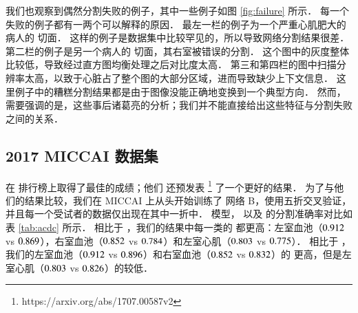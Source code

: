 

我们也观察到偶然分割失败的例子，其中一些例子如图 \ref{fig:failure} 所示．
每一个失败的例子都有一两个可以解释的原因．
最左一栏的例子为一个严重心肌肥大的病人的 \SA{} 切面．
这样的例子是数据集中比较罕见的，所以导致网络分割结果很差．
第二栏的例子是另一个病人的 \SA{} 切面，其右室被错误的分割．
这个图中的灰度整体比较低，导致经过直方图均衡处理之后对比度太高．
第三和第四栏的图中扫描分辨率太高，以致于心脏占了整个图的大部分区域，进而导致缺少上下文信息．
这里例子中的糟糕分割结果都是由于图像没能正确地变换到一个典型方向．
然而，需要强调的是，这些事后诸葛亮的分析；我们并不能直接给出这些特征与分割失败之间的关系．

\subsection{2017 MICCAI \miccaidata{} 数据集}

\citet{Isensee2017} 在 \miccaidata{} 排行榜上取得了最佳的成绩；他们 \citep{Isensee2018} 还预发表 \footnote{https://arxiv.org/abs/1707.00587v2} 了一个更好的结果．
为了与他们的结果比较，我们在 MICCAI \miccaidata{} 上从头开始训练了 \omeganet{} 网络 B，使用五折交叉验证，并且每一个受试者的数据仅出现在其中一折中．
\omeganet{} 模型，\citet{Isensee2017} 以及 \citet{Isensee2018} 的分割准确率对比如表 \ref{tab:acdc} 所示．
相比于 \citet{Isensee2017}，我们的结果中每一类的 \IoU{} 都更高：左室血池（$0.912{}$ vs $0.869{}$），右室血池（$0.852{}$ vs $0.784{}$）和左室心肌（$0.803{}$ vs $0.775{}$）．
相比于 \citet{Isensee2018}，我们的左室血池（$0.912{}$ vs $0.896{}$）和右室血池（$0.852{}$ vs $0.832{}$）的 \IoU{} 更高，但是左室心肌（$0.803{}$ vs $0.826{}$）的较低．
